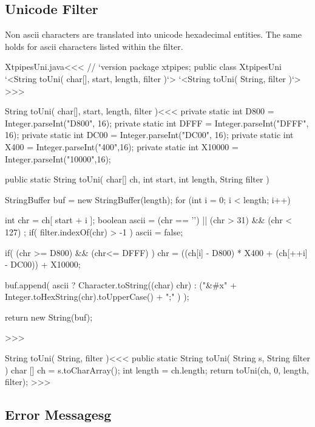 \documentclass{article}
\begin{document}
\subsection{Unicode Filter}

Non ascii characters are translated into unicode hexadecimal entities.
The same holds for ascii characters listed within the filter.



\<XtpipesUni.java\><<<
// `version
package xtpipes;
public class XtpipesUni{
   `<String toUni( char[], start, length, filter )`>
   `<String toUni( String, filter )`>
}
>>>

\<String toUni( char[], start, length, filter )\><<<
private static int D800 = Integer.parseInt("D800", 16); 
private static int DFFF = Integer.parseInt("DFFF", 16);  
private static int DC00 = Integer.parseInt("DC00", 16); 
private static int X400 = Integer.parseInt("400",16); 
private static int X10000 = Integer.parseInt("10000",16);


public static String toUni( char[] ch, int start, int length, 
                                           String filter ){
   StringBuffer buf = new StringBuffer(length);
   for (int i = 0; i < length; i++) {
       int chr = ch[ start + i ];
       boolean ascii =  (chr == '\n')
                        || (chr > 31) && (chr < 127) ;
       if( filter.indexOf(chr) > -1 ){ ascii = false; }

       if( (chr >= D800) && (chr<= DFFF) ){ 
          chr = ((ch[i] - D800) * X400 + (ch[++i] - DC00)) + X10000;       
       } 


       buf.append(
         ascii ? Character.toString((char) chr)
               : ("&#x" 
                 + Integer.toHexString(chr).toUpperCase()
                 + ";" ) );
   }
   return new String(buf);
}
>>>

\<String toUni( String, filter )\><<<
public static String toUni( String s, String filter ){
   char [] ch = s.toCharArray();
   int length = ch.length;
   return toUni(ch, 0, length, filter);
}
>>>







\subsection{Error Messagesg}
\end{document}
